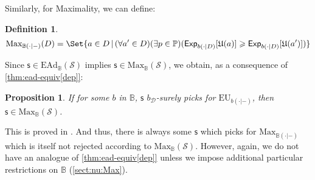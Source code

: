 \documentclass[a4paper]{article}
\newtheorem{definition}{Definition}
\newtheorem{proposition}[theorem]{Proposition}
\renewcommand\P{\mathbb{P}} %
\newcommand\Exp{\mathsf{Exp}}
\newcommand\EU{\mathrm{EU}}
\newcommand\EAd{\mathrm{EAd}}
\newcommand\U{\mathfrak{U}} %
\newcommand\Maximality{\mathrm{Max}}
\newcommand{\Decs}{\mathcal{D}}
\renewcommand\S{\mathcal{S}}
\newcommand\s{\mathsf{s}}
\newcommand{\IB}{\mathbb{B}}
\newcommand{\IP}{\P}
\newcommand{\Strategies}{\S}
\newcommand\SetDelimiter[1][]{
	\nonscript\,#1\vert \allowbreak \nonscript\,\mathopen{}}
\providecommand\given{\SetDelimiter}
\renewcommand{\geq}{\geqslant}
\newenvironment{CCM rewritten}
{\begingroup\color{blue}} %
{\endgroup}              %
\begin{document}
Similarly, for Maximality, we can define: 
\begin{definition}
	$$\Maximality_{\IB(\cdot|-)}(D) = \Set{a \in D \given (\forall a' \in D)(\exists p\in\IP)(\Exp_{b(\cdot|D)}[\U(a)]\geq\Exp_{b(\cdot|D)}[\U(a')])}
	$$\end{definition}
	Since $\s\in\EAd_\IB(\S)$ implies $\s\in\Maximality_\IB(\S)$, we obtain, as a consequence of \cref{thm:ead-equiv[dep]}:
	\begin{proposition}\label{thm:max-suff[dep]}
	If for some $b$ in $\IB$, $\s$ $b_\Decs$-surely picks for $\EU_{b(\cdot|-)}$, then $\s\in\Maximality_\IB(\Strategies)$. 
\end{proposition}This is proved in . And thus, there is always some $\s$ which picks for $\Maximality_{\IB(\cdot|-)}$ which is itself not rejected according to $\Maximality_\IB(\Strategies)$. However, again, we do not have %
an analogue of \cref{thm:ead-equiv[dep]} unless we impose additional particular restrictions on $\IB$ (\cref{sect:nu:Max}).
\end{document}
